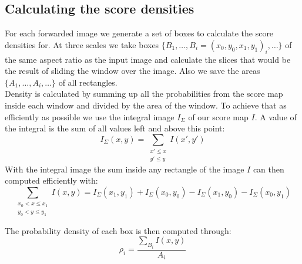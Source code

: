 \subsection{Calculating the score densities}
\label{sec:pipeline:eval:density}
For each forwarded image we generate a set of boxes to calculate the score densities for. At three scales we take boxes $\{B_1,\dotsc, B_i = (x_0, y_0, x_1, y_1)_i,\dotsc\}$ of the same aspect ratio as the input image and calculate the slices that would be the result of sliding the window over the image. Also we save the areas $\{A_1,\dotsc, A_i,\dotsc\}$ of all rectangles.\\
Density is calculated by summing up all the probabilities from the score map inside each window and divided by the area of the window. To achieve that as efficiently as possible we use the integral image $I_\Sigma$ of our score map $I$. A value of the integral is the sum of all values left and above this point:
\begin{equation}
    I_\Sigma(x, y) = \sum_{\substack{x' \le x\\ y' \le y}} I(x', y')
\end{equation}
With the integral image the sum inside any rectangle of the image $I$ can then computed efficiently with:
\begin{equation}
    \sum_{\substack{x_0 < x \le x_1\\ y_0 < y \le y_1}}I(x,y) = I_\Sigma(x_1, y_1) + I_\Sigma(x_0, y_0) - I_\Sigma(x_1, y_0) - I_\Sigma(x_0, y_1)
\end{equation}

The probability density of each box is then computed through:
\begin{equation}
    \rho_i = \frac{\sum_{B_i}I(x,y)}{A_i}
\end{equation}


